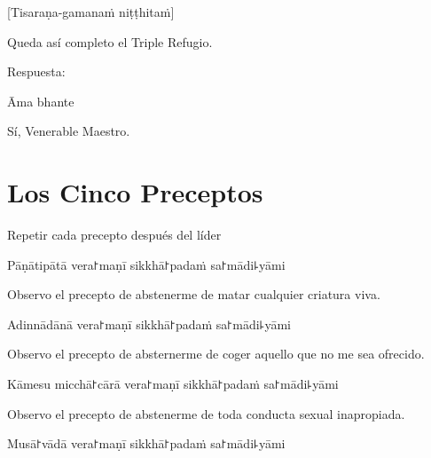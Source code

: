 [Tisaraṇa-gamanaṁ niṭṭhitaṁ]

\begin{english}
  Queda así completo el Triple Refugio.
\end{english}

\begin{instruction}
  Respuesta:
\end{instruction}

Āma bhante

\begin{english}
  Sí, Venerable Maestro.
\end{english}

\chapter{Los Cinco Preceptos}

\begin{instruction}
  Repetir cada precepto después del líder
\end{instruction}

\begin{precept}
  \setcounter{enumi}{0}
  \item Pāṇātipātā vera꜓maṇī sikkhā꜓padaṁ sa꜓mādi꜕yāmi
\end{precept}

\begin{english}
  Observo el precepto de abstenerme de matar cualquier criatura viva.
\end{english}

\begin{precept}
  \setcounter{enumi}{1}
  \item Adinnādānā vera꜓maṇī sikkhā꜓padaṁ sa꜓mādi꜕yāmi
\end{precept}

\begin{english}
  Observo el precepto de absternerme de coger aquello que no me sea ofrecido.
\end{english}

\begin{precept}
  \setcounter{enumi}{2}
  \item Kāmesu micchā꜓cārā vera꜓maṇī sikkhā꜓padaṁ sa꜓mādi꜕yāmi
\end{precept}

\begin{english}
  Observo el precepto de abstenerme de toda conducta sexual inapropiada.
\end{english}

\begin{precept}
  \setcounter{enumi}{3}
  \item Musā꜓vādā vera꜓maṇī sikkhā꜓padaṁ sa꜓mādi꜕yāmi
\end{precept}

